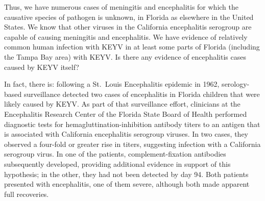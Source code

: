\documentclass[12pt]{article}
\newcommand{\eg}{\textit{e.g.}}
\newcommand{\cjh}{\textcolor{blue}{cjh}}
\newcommand{\tjh}{\textcolor{red}{tjh}}
\newcommand{\jal}{\textcolor{green}{jal}}
\newcommand{\msg}[3]{(#1 $\rightarrow$ #2: #3)}
\newcommand{\mtc}[1]{\msg\tjh\cjh{#1}}
\newcommand{\mjc}[1]{\msg\jal\cjh{#1}}
\begin{document}
        

        Thus, we have numerous cases of meningitis and encephalitis for which the causative species of pathogen is unknown, in Florida as elsewhere in the United States. %
        We know that other viruses in the California encephalitis serogroup are capable of causing meningitis and encephalitis.  We have evidence of relatively common human infection with KEYV in at least some parts of Florida (including the Tampa Bay area) with KEYV. Is there any evidence of encephalitis cases caused by KEYV itself?

        In fact, there is: following a St.\ Louis Encephalitis epidemic in 1962, serology-based surveillance detected two cases of encephalitis in Florida children that were likely caused by KEYV. As part of that surveillance effort, clinicians at the Encephalitis Research Center of the Florida State Board of Health performed diagnostic tests for hemagluttination-inhibition antibody titers to an antigen that is associated with California encephalitis serogroup viruses. In two cases, they observed a four-fold or greater rise in titers, suggesting infection with a California serogroup virus. In one of the patients, complement-fixation antibodies subsequently developed, providing additional evidence in support of this hypothesis; in the other, they had not been detected by day 94. Both patients presented with encephalitis, one of them severe, although both made apparent full recoveries.\cite{bond1966california}
\end{document}
